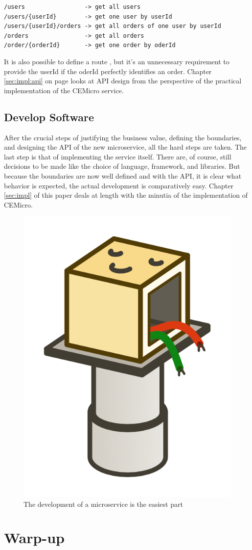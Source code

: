 \begin{lstlisting}
/users                 -> get all users
/users/{userId}        -> get one user by userId
/users/{userId}/orders -> get all orders of one user by userId
/orders                -> get all orders
/order/{orderId}       -> get one order by oderId
\end{lstlisting}

It is also possible to define a route , but it's an unnecessary requirement to provide the userId if the oderId perfectly identifies an order. Chapter \ref{sec:impl:api} on page \pageref{sec:impl:api} looks at API design from the perspective of the practical implementation of the CEMicro service.


\subsection{Develop Software}

After the crucial steps of justifying the business value, defining the boundaries, and designing the API of the new microservice, all the hard steps are taken. The last step is that of implementing the service itself. There are, of course, still decisions to be made like the choice of language, framework, and libraries. But because the boundaries are now well defined and with the API, it is clear what behavior is expected, the actual development is comparatively easy. Chapter \ref{sec:impl} of this paper deals at length with the minutia of the implementation of CEMicro.

\begin{figure}[ht]
  \centering
  \includegraphics[width=0.2\linewidth]{assets/illustration-microservice-development.png}
  \caption{The development of a microservice is the easiest part}
\end{figure}



\section{Warp-up}

